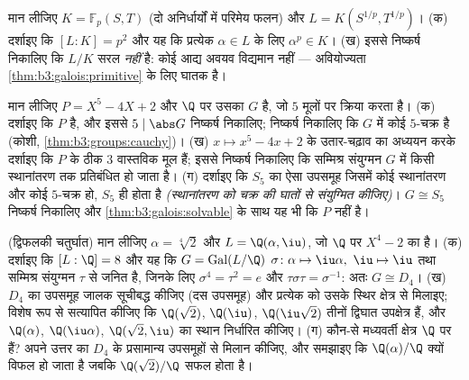 \begin{exercise}[$\star\star\star$]\label{exo:b3:galois:10}
मान लीजिए $K = \mathbb F_p(S, T)$ (दो अनिर्धार्यों में परिमेय फलन) और $L = K(S^{1/p}, T^{1/p})$।
(क) दर्शाइए कि $[L:K] = p^2$ और यह कि प्रत्येक $\alpha \in L$ के लिए $\alpha^p \in K$।
(ख) इससे निष्कर्ष निकालिए कि $L/K$ सरल \emph{नहीं} है: कोई आद्य
अवयव विद्यमान नहीं --- अवियोज्यता \cref{thm:b3:galois:primitive} के लिए घातक है।
\end{exercise}

\begin{exercise}[$\star\star\star$]\label{exo:b3:galois:11}
मान लीजिए $P = X^5 - 4X + 2$ और $\Q$ पर उसका  $G$ है, जो $5$
मूलों पर क्रिया करता है।
(क) दर्शाइए कि $P$  है, और इससे $5 \mid \abs G$ निष्कर्ष
निकालिए; निष्कर्ष निकालिए कि $G$ में कोई $5$-चक्र है (कोशी,
\cref{thm:b3:groups:cauchy})।
(ख) $x \mapsto x^5 - 4x +
2$ के उतार-चढ़ाव का अध्ययन करके दर्शाइए कि $P$ के ठीक
$3$ वास्तविक मूल हैं; इससे निष्कर्ष निकालिए कि सम्मिश्र
संयुग्मन $G$ में किसी स्थानांतरण तक प्रतिबंधित हो जाता है।
(ग) दर्शाइए कि $S_5$ का ऐसा उपसमूह जिसमें कोई स्थानांतरण और कोई
$5$-चक्र हो, $S_5$ ही होता है \emph{(स्थानांतरण को चक्र की
घातों से संयुग्मित कीजिए)}। $G \cong S_5$ निष्कर्ष निकालिए और \cref{thm:b3:galois:solvable} के
साथ यह भी कि $P$  नहीं है।
\end{exercise}

\begin{exercise}[$\star\star\star$]\label{exo:b3:galois:12}
(द्विफलकी चतुर्घात) मान लीजिए $\alpha = \sqrt[4]2$ और $L =
\Q(\alpha, \iu)$, जो $\Q$ पर
$X^4 - 2$ का  है।
(क) दर्शाइए कि $[L : \Q] = 8$ और यह कि $G =
\operatorname{Gal}(L/\Q)$ $\sigma\colon
\alpha \mapsto \iu\alpha,\ \iu \mapsto \iu$ तथा सम्मिश्र
संयुग्मन $\tau$ से जनित है, जिनके लिए $\sigma^4 = \tau^2 = e$ और $\tau\sigma\tau = \sigma^{-1}$: अतः
$G \cong D_4$।
(ख) $D_4$ का उपसमूह जालक सूचीबद्ध कीजिए (दस उपसमूह) और प्रत्येक
को उसके स्थिर क्षेत्र से मिलाइए; विशेष रूप से सत्यापित कीजिए कि
$\Q(\sqrt2)$, $\Q(\iu)$, $\Q(\iu\sqrt2)$ तीनों द्विघात उपक्षेत्र हैं, और $\Q(\alpha)$,
$\Q(\iu\alpha)$, $\Q(\sqrt2, \iu)$ का स्थान निर्धारित कीजिए।
(ग) कौन-से मध्यवर्ती क्षेत्र $\Q$ पर  हैं? अपने उत्तर का
$D_4$ के प्रसामान्य उपसमूहों से मिलान कीजिए, और समझाइए कि
$\Q(\alpha)/\Q$ क्यों विफल हो जाता है जबकि $\Q(\sqrt2)/\Q$ सफल होता है।
\end{exercise}

